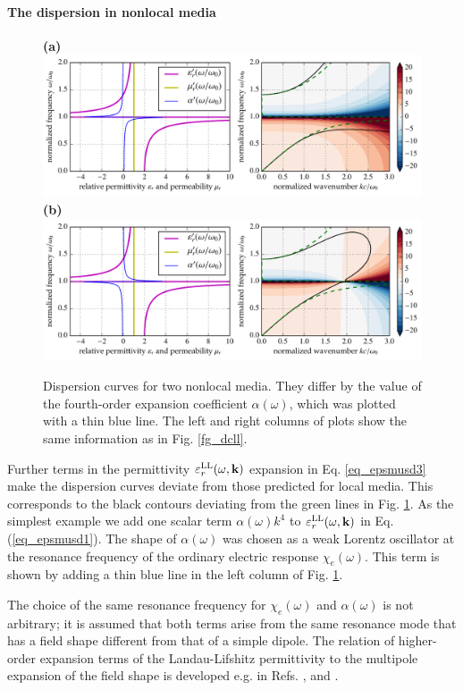\paragraph{The dispersion in nonlocal media} %
\begin{figure}[t] \caption{Dispersion curves for two nonlocal media. They differ by the value of the fourth-order expansion coefficient $\alpha(\omega)$, which was plotted with a thin blue line. The left and right columns of plots show the same information as in Fig. \ref{fg_dcll}.  } \label{fg_dcll_nl} \centering  
\textbf{(a)}\\	\includegraphics[width=1\textwidth]{img/dispersion_landau_lifshitz/dispersion_ll_quadrupp.pdf}
\textbf{(b)}\\	\includegraphics[width=1\textwidth]{img/dispersion_landau_lifshitz/dispersion_ll_quadrupn.pdf}
\end{figure}
Further terms in the permittivity $\varepsilon_r^\text{LL}(\omega,{\mathbf{k}})$ expansion in Eq. \ref{eq_epsmusd3} make the dispersion curves deviate from those predicted for local media. This corresponds to the black contours deviating from the green lines in Fig. \ref{fg_dcll_nl}.
As the simplest example we add one scalar term $\alpha(\omega) k^4$ to $\varepsilon_r^\text{LL}(\omega,{\mathbf{k}})$ in Eq. (\ref{eq_epsmusd1}). The shape of $\alpha(\omega)$  was chosen as a weak Lorentz oscillator at the resonance frequency of the ordinary electric response $\chi_e(\omega)$. This term is shown by adding a thin blue line in the left column of Fig. \ref{fg_dcll_nl}.

\label{chap_sd}
The choice of the same resonance frequency for $\chi_e(\omega)$ and $\alpha(\omega)$ is not arbitrary; it is assumed that both terms arise from the same resonance mode that has a field shape different from that of a simple dipole. The relation of higher-order expansion terms of the Landau-Lifshitz permittivity  to the multipole expansion of the field shape is developed e.g. in Refs. \cite{agranovich2006spatial}, \cite{vinogradov2002form} and \cite{fietz2011homogenization}.

